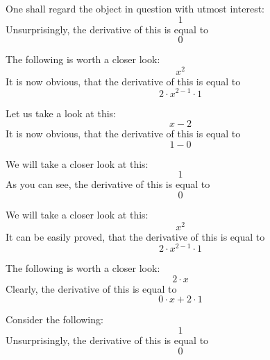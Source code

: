 \documentclass{article}
\begin{document}
One shall regard the object in question with utmost interest:
\begin{equation}
1 
\end{equation}
Unsurprisingly, the derivative of this is equal to
\begin{equation}
0 
\end{equation}

The following is worth a closer look:
\begin{equation}
x ^{2 } 
\end{equation}
It is now obvious, that the derivative of this is equal to
\begin{equation}
2 \cdot x ^{2 - 1 } \cdot 1 
\end{equation}

Let us take a look at this:
\begin{equation}
x - 2 
\end{equation}
It is now obvious, that the derivative of this is equal to
\begin{equation}
1 - 0 
\end{equation}

We will take a closer look at this:
\begin{equation}
1 
\end{equation}
As you can see, the derivative of this is equal to
\begin{equation}
0 
\end{equation}

We will take a closer look at this:
\begin{equation}
x ^{2 } 
\end{equation}
It can be easily proved, that the derivative of this is equal to
\begin{equation}
2 \cdot x ^{2 - 1 } \cdot 1 
\end{equation}

The following is worth a closer look:
\begin{equation}
2 \cdot x 
\end{equation}
Clearly, the derivative of this is equal to
\begin{equation}
0 \cdot x + 2 \cdot 1 
\end{equation}

Consider the following:
\begin{equation}
1 
\end{equation}
Unsurprisingly, the derivative of this is equal to
\begin{equation}
0 
\end{equation}
\end{document}
